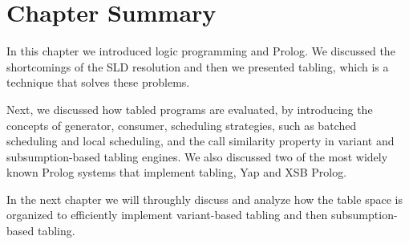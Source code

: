 \section{Chapter Summary}

In this chapter we introduced logic programming and Prolog. We discussed the shortcomings of the
SLD resolution and then we presented tabling, which is a technique that solves these problems.

Next, we discussed how tabled programs are evaluated, by introducing the concepts of generator,
consumer, scheduling strategies, such as batched scheduling and local scheduling, and
the call similarity property in variant and subsumption-based tabling engines.
We also discussed two of the most widely known Prolog systems that implement tabling, Yap and XSB Prolog.

In the next chapter we will throughly discuss and analyze how the table space is organized to efficiently
implement variant-based tabling and then subsumption-based tabling.
